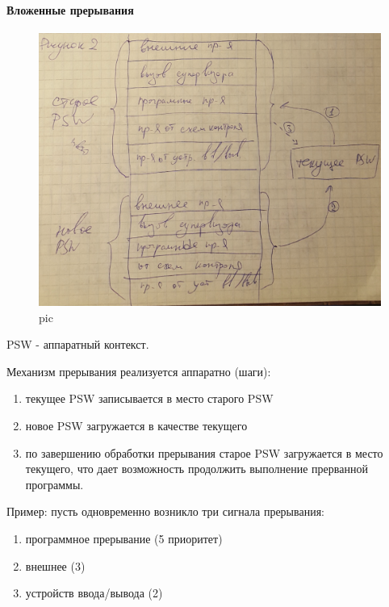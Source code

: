 \paragraph{Вложенные прерывания}

\begin{figure}[H]
    \centering
    \includegraphics[width=\textwidth]{pic/2.png}
    \caption{pic}
\end{figure}

PSW - аппаратный контекст. 

Механизм прерывания реализуется аппаратно (шаги):
\begin{enumerate}
    \item текущее PSW записывается в место старого PSW
    \item новое PSW загружается в качестве текущего
    \item по завершению обработки прерывания старое PSW загружается в место текущего, что дает возможность продолжить выполнение прерванной программы.
\end{enumerate} 

Пример: пусть одновременно возникло три сигнала прерывания:
\begin{enumerate}
    \item программное прерывание (5 приоритет)
    \item внешнее (3)
    \item устройств ввода/вывода (2)
\end{enumerate} 


